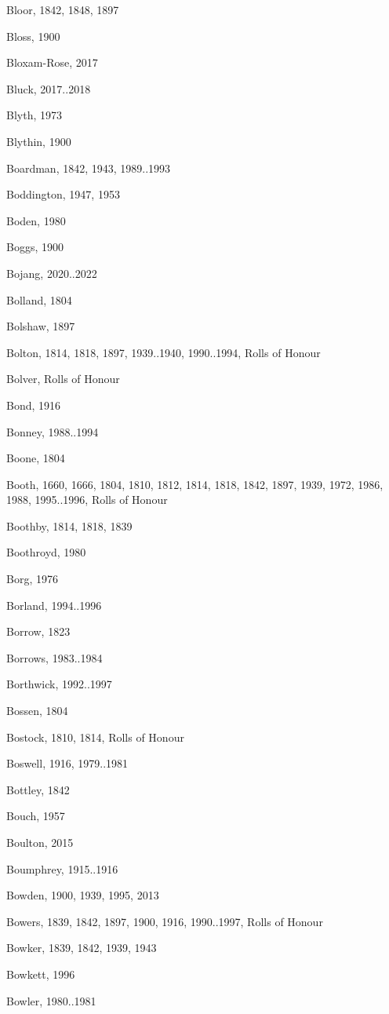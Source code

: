 {\begin{theindex}
\item Bloor, 1842, 1848, 1897
\item Bloss, 1900
\item Bloxam-Rose, 2017
\item Bluck, 2017..2018
\item Blyth, 1973
\item Blythin, 1900
\item Boardman, 1842, 1943, 1989..1993
\item Boddington, 1947, 1953
\item Boden, 1980
\item Boggs, 1900
\item Bojang, 2020..2022
\item Bolland, 1804
\item Bolshaw, 1897
\item Bolton, 1814, 1818, 1897, 1939..1940, 1990..1994, Rolls of Honour
\item Bolver, Rolls of Honour
\item Bond, 1916
\item Bonney, 1988..1994
\item Boone, 1804
\item Booth, 1660, 1666, 1804, 1810, 1812, 1814, 1818, 1842, 1897, 1939, 1972, 1986, 1988, 1995..1996, Rolls of Honour
\item Boothby, 1814, 1818, 1839
\item Boothroyd, 1980
\item Borg, 1976
\item Borland, 1994..1996
\item Borrow, 1823
\item Borrows, 1983..1984
\item Borthwick, 1992..1997
\item Bossen, 1804
\item Bostock, 1810, 1814, Rolls of Honour
\item Boswell, 1916, 1979..1981
\item Bottley, 1842
\item Bouch, 1957
\item Boulton, 2015
\item Boumphrey, 1915..1916
\item Bowden, 1900, 1939, 1995, 2013
\item Bowers, 1839, 1842, 1897, 1900, 1916, 1990..1997, Rolls of Honour
\item Bowker, 1839, 1842, 1939, 1943
\item Bowkett, 1996
\item Bowler, 1980..1981

\end{theindex}}
